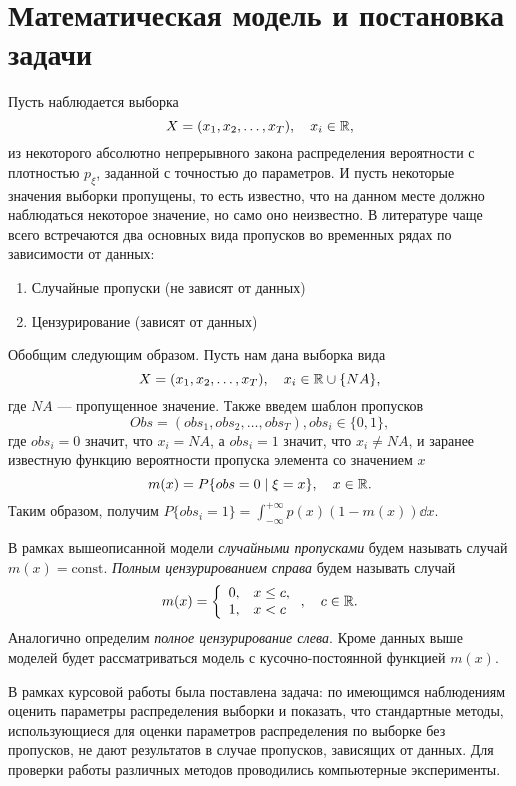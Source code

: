 \section{Математическая модель и постановка задачи}

    Пусть наблюдается выборка
    \begin{equation*}
        X = (x_1, x_2, \dots , x_T), \quad x_i \in \mathbb{R} ,
    \end{equation*}
    из некоторого абсолютно непрерывного закона распределения вероятности с плотностью $p_\xi$, заданной с точностью 
    до параметров. И пусть некоторые значения выборки пропущены, то есть известно, что на 
    данном месте должно наблюдаться некоторое значение, но само оно неизвестно. В литературе чаще всего встречаются 
    два основных вида пропусков во временных рядах по зависимости от данных:
    \begin{enumerate}
        \item Случайные пропуски (не зависят от данных)
        \item Цензурирование (зависят от данных)
    \end{enumerate}

    Обобщим следующим образом. Пусть нам дана выборка вида
    \begin{equation*}
        X = (x_1, x_2, \dots , x_T), \quad x_i \in \mathbb{R} \cup \{ NA \},
    \end{equation*}
    где $NA$ --- пропущенное значение. Также введем шаблон пропусков 
    \begin{equation*}
        Obs = (obs_1, obs_2, \dots, obs_T), obs_i \in \{ 0,1 \},
    \end{equation*}
    где $obs_i = 0$ значит, что $x_i = NA$, а $obs_i = 1$ значит, что $x_i \ne NA$, и заранее известную функцию
    вероятности пропуска элемента со значением $x$
    \begin{equation*}
        m(x) = P\{obs = 0 \mid \xi = x\}, \quad x \in \mathbb{R} .
    \end{equation*}
    Таким образом, получим $\displaystyle P\{obs_i = 1\} = \int_{-\infty}^{+\infty} p(x)(1 - m(x))\dd x$.

    В рамках вышеописанной модели \textit{случайными пропусками} будем называть случай $m(x) = \text{const}$. 
    \textit{Полным цензурированием справа} будем называть случай
    \begin{equation*}
        m(x) = \left\{
        \begin{array}{ll}
            0, & x \leq c, \\
            1, & x < c
        \end{array}\right. , \quad c \in \mathbb{R} .
    \end{equation*}
    Аналогично определим \textit{полное цензурирование слева}. Кроме данных выше моделей будет рассматриваться модель 
    с кусочно-постоянной функцией $m(x)$.

    В рамках курсовой работы была поставлена задача: по имеющимся наблюдениям оценить параметры распределения выборки 
    и показать, что стандартные методы, использующиеся для оценки параметров распределения по выборке без пропусков, 
    не дают результатов в случае пропусков, зависящих от данных. Для проверки работы различных методов проводились 
    компьютерные эксперименты.